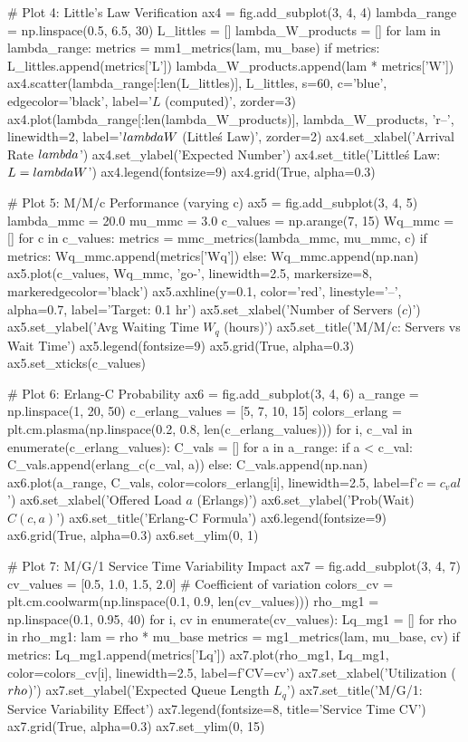 \documentclass[a4paper, 11pt]{article}
\begin{document}
\begin{pycode}
# Plot 4: Little's Law Verification
ax4 = fig.add_subplot(3, 4, 4)
lambda_range = np.linspace(0.5, 6.5, 30)
L_littles = []
lambda_W_products = []
for lam in lambda_range:
    metrics = mm1_metrics(lam, mu_base)
    if metrics:
        L_littles.append(metrics['L'])
        lambda_W_products.append(lam * metrics['W'])
ax4.scatter(lambda_range[:len(L_littles)], L_littles, s=60, c='blue',
            edgecolor='black', label='$L$ (computed)', zorder=3)
ax4.plot(lambda_range[:len(lambda_W_products)], lambda_W_products, 'r--',
         linewidth=2, label='$\\lambda W$ (Little\'s Law)', zorder=2)
ax4.set_xlabel('Arrival Rate $\\lambda$')
ax4.set_ylabel('Expected Number')
ax4.set_title('Little\'s Law: $L = \\lambda W$')
ax4.legend(fontsize=9)
ax4.grid(True, alpha=0.3)

# Plot 5: M/M/c Performance (varying c)
ax5 = fig.add_subplot(3, 4, 5)
lambda_mmc = 20.0
mu_mmc = 3.0
c_values = np.arange(7, 15)
Wq_mmc = []
for c in c_values:
    metrics = mmc_metrics(lambda_mmc, mu_mmc, c)
    if metrics:
        Wq_mmc.append(metrics['Wq'])
    else:
        Wq_mmc.append(np.nan)
ax5.plot(c_values, Wq_mmc, 'go-', linewidth=2.5, markersize=8, markeredgecolor='black')
ax5.axhline(y=0.1, color='red', linestyle='--', alpha=0.7, label='Target: 0.1 hr')
ax5.set_xlabel('Number of Servers ($c$)')
ax5.set_ylabel('Avg Waiting Time $W_q$ (hours)')
ax5.set_title('M/M/c: Servers vs Wait Time')
ax5.legend(fontsize=9)
ax5.grid(True, alpha=0.3)
ax5.set_xticks(c_values)

# Plot 6: Erlang-C Probability
ax6 = fig.add_subplot(3, 4, 6)
a_range = np.linspace(1, 20, 50)
c_erlang_values = [5, 7, 10, 15]
colors_erlang = plt.cm.plasma(np.linspace(0.2, 0.8, len(c_erlang_values)))
for i, c_val in enumerate(c_erlang_values):
    C_vals = []
    for a in a_range:
        if a < c_val:
            C_vals.append(erlang_c(c_val, a))
        else:
            C_vals.append(np.nan)
    ax6.plot(a_range, C_vals, color=colors_erlang[i], linewidth=2.5,
             label=f'$c={c_val}$')
ax6.set_xlabel('Offered Load $a$ (Erlangs)')
ax6.set_ylabel('Prob(Wait) $C(c,a)$')
ax6.set_title('Erlang-C Formula')
ax6.legend(fontsize=9)
ax6.grid(True, alpha=0.3)
ax6.set_ylim(0, 1)

# Plot 7: M/G/1 Service Time Variability Impact
ax7 = fig.add_subplot(3, 4, 7)
cv_values = [0.5, 1.0, 1.5, 2.0]  # Coefficient of variation
colors_cv = plt.cm.coolwarm(np.linspace(0.1, 0.9, len(cv_values)))
rho_mg1 = np.linspace(0.1, 0.95, 40)
for i, cv in enumerate(cv_values):
    Lq_mg1 = []
    for rho in rho_mg1:
        lam = rho * mu_base
        metrics = mg1_metrics(lam, mu_base, cv)
        if metrics:
            Lq_mg1.append(metrics['Lq'])
    ax7.plot(rho_mg1, Lq_mg1, color=colors_cv[i], linewidth=2.5,
             label=f'CV={cv}')
ax7.set_xlabel('Utilization ($\\rho$)')
ax7.set_ylabel('Expected Queue Length $L_q$')
ax7.set_title('M/G/1: Service Variability Effect')
ax7.legend(fontsize=8, title='Service Time CV')
ax7.grid(True, alpha=0.3)
ax7.set_ylim(0, 15)


\end{pycode}
\end{document}
